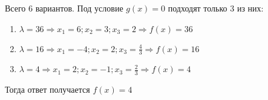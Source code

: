 \documentclass[a4paper]{article}
\begin{document}
Всего 6 вариантов. Под условие $g(x) = 0$ подходят только 3 из них:
\begin{enumerate}
    \item $\lambda = 36 \Longrightarrow x_1 = 6; x_2 = 3 ; x_3 = 2  \Longrightarrow f(x) = 36$ \item $\lambda = 16 \Longrightarrow x_1 = -4; x_2 = 2 ; x_3 = \frac{4}{3}  \Longrightarrow f(x) = 16$
    \item $\lambda = 4 \Longrightarrow x_1 = 2; x_2 = -1 ; x_3 = \frac{2}{3}  \Longrightarrow f(x) = 4$
\end{enumerate}

Тогда ответ получается $f(x) = 4$
\end{document}
